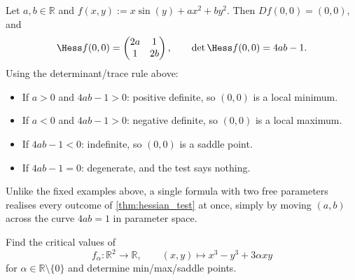 \begin{example}
\label{ex:two_parameter_hessian_family}
Let $a,b \in \mathbb{R}$ and $f(x,y) := x\sin(y) + ax^2 + by^2$. Then $Df(0,0) = (0,0)$, and
\[\Hess f(0,0) = \begin{pmatrix} 2a & 1 \\ 1 & 2b \end{pmatrix}, \qquad \det\Hess f(0,0) = 4ab-1.\]
Using the determinant/trace rule above:
\begin{itemize}
  \item If $a>0$ and $4ab-1>0$: positive definite, so $(0,0)$ is a local minimum.
  \item If $a<0$ and $4ab-1>0$: negative definite, so $(0,0)$ is a local maximum.
  \item If $4ab-1<0$: indefinite, so $(0,0)$ is a saddle point.
  \item If $4ab-1=0$: degenerate, and the test says nothing.
\end{itemize}
Unlike the fixed examples above, a single formula with two free parameters realises every
outcome of \cref{thm:hessian_test} at once, simply by moving $(a,b)$ across the curve $4ab=1$ in
parameter space.
\end{example}

\begin{exercise}
\label{ex:cubic_saddle_family}
Find the critical values of
\[f_\alpha : \mathbb{R}^2 \to \mathbb{R}, \qquad (x,y) \mapsto x^3 - y^3 + 3\alpha xy\]
for $\alpha \in \mathbb{R}\setminus\{0\}$ and determine min/max/saddle points.
\end{exercise}

